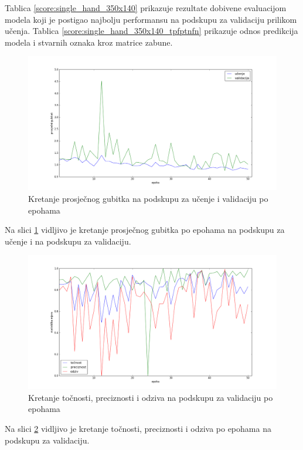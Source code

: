 \documentclass[times, utf8, diplomski, numeric]{fer}
\begin{document}
\noindent Tablica \ref{score:single_hand_350x140} prikazuje rezultate dobivene evaluacijom modela koji je postigao najbolju performansu na podskupu za validaciju prilikom učenja.
Tablica \ref{score:single_hand_350x140_tpfptnfn} prikazuje odnos predikcija modela i stvarnih oznaka kroz matrice zabune.

\begin{figure}[H]
\centering
\includegraphics[scale=0.35]{images/single_hand_scale050_loss.png}
\caption{Kretanje prosječnog gubitka na podskupu za učenje i validaciju po epohama}
\label{img:single_hand_scale050_loss}
\end{figure}
\noindent Na slici \ref{img:single_hand_scale050_loss} vidljivo je kretanje prosječnog gubitka po epohama na podskupu za učenje i na podskupu za validaciju.

\begin{figure}[H]
\centering
\includegraphics[scale=0.35]{images/single_hand_scale050_acc_ap.png}
\caption{Kretanje točnosti, preciznosti i odziva na podskupu za validaciju po epohama}
\label{img:single_hand_scale050_acc_ap}
\end{figure}
\noindent Na slici \ref{img:single_hand_scale050_acc_ap} vidljivo je kretanje točnosti, preciznosti i odziva po epohama na podskupu za validaciju.
\end{document}
